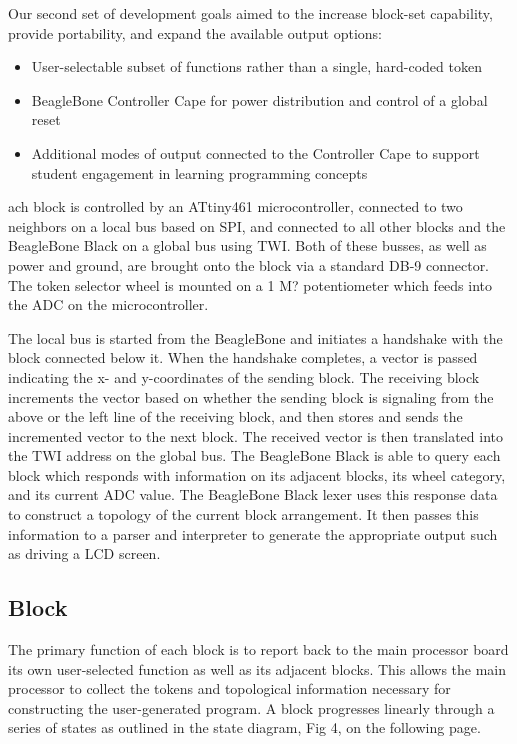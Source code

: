 \documentclass[12pt,a4paper]{article}
\begin{document}
Our second set of development goals aimed to the increase block-set capability, provide portability, and expand the available output options:
\begin{itemize}
	\item User-selectable subset of functions rather than a single, hard-coded token
	\item BeagleBone Controller Cape for power distribution and control of a global reset
	\item Additional modes of output connected to the Controller Cape to support student engagement in learning programming concepts
	
\end{itemize}
ach block is controlled by an ATtiny461 microcontroller, connected to two neighbors on a local bus based on SPI, and connected to all other blocks and the BeagleBone Black on a global bus using TWI. Both of these busses, as well as power and ground, are brought onto the block via a standard DB-9 connector. The token selector wheel is mounted on a 1 M? potentiometer which feeds into the ADC on the microcontroller.


The local bus is started from the BeagleBone and initiates a handshake with the block connected below it. When the handshake completes, a vector is passed indicating the x- and y-coordinates of the sending block. The receiving block increments the vector based on whether the sending block is signaling from the above or the left line of the receiving block, and then stores and sends the incremented vector to the next block. The received vector is then translated into the TWI address on the global bus. The BeagleBone Black is able to query each block which responds with information on its adjacent blocks, its wheel category, and its current ADC value. The BeagleBone Black lexer uses this response data to construct a topology of the current block arrangement. It then passes this information to a parser and interpreter to generate the appropriate output such as driving a LCD screen.
\subsection{Block}
    The primary function of each block is to report back to the main processor board its own user-selected function as well as its adjacent blocks. This allows the main processor to collect the tokens and topological information necessary for constructing the user-generated program. A block progresses linearly through a series of states as outlined in the state diagram, Fig 4, on the following page.
\end{document}
